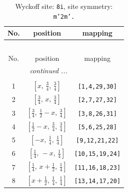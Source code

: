 \documentclass[fleqn,8pt]{jsarticle}
\begin{document}
\begin{longtable}{ccc}
\caption{Wyckoff site: {\tt 8i}, site symmetry: {\tt m'2m'.}}
 \\
 \hline \hline
No. & position & mapping \\ \hline \endfirsthead

\multicolumn{2}{l}{\tablename\ \thetable{}} \\
 \hline \hline
No. & position & mapping \\ \hline \endhead

 \hline \hline
\multicolumn{2}{r}{\footnotesize\it continued ...} \\ \endfoot

 \hline \hline
\multicolumn{2}{r}{} \\ \endlastfoot

1 & $\left[ x,\, \frac{3}{4},\, \frac{3}{4} \right]$ & {\tt [1,4,29,30]} \\ \hline
2 & $\left[ \frac{3}{4},\, x,\, \frac{3}{4} \right]$ & {\tt [2,7,27,32]} \\ \hline
3 & $\left[ \frac{3}{4},\, \frac{1}{2} - x,\, \frac{3}{4} \right]$ & {\tt [3,8,26,31]} \\ \hline
4 & $\left[ \frac{1}{2} - x,\, \frac{3}{4},\, \frac{3}{4} \right]$ & {\tt [5,6,25,28]} \\ \hline
5 & $\left[ - x,\, \frac{1}{4},\, \frac{1}{4} \right]$ & {\tt [9,12,21,22]} \\ \hline
6 & $\left[ \frac{1}{4},\, - x,\, \frac{1}{4} \right]$ & {\tt [10,15,19,24]} \\ \hline
7 & $\left[ \frac{1}{4},\, x + \frac{1}{2},\, \frac{1}{4} \right]$ & {\tt [11,16,18,23]} \\ \hline
8 & $\left[ x + \frac{1}{2},\, \frac{1}{4},\, \frac{1}{4} \right]$ & {\tt [13,14,17,20]} \\
\end{longtable}
\renewcommand{\arraystretch}{1.2}
\end{document}
